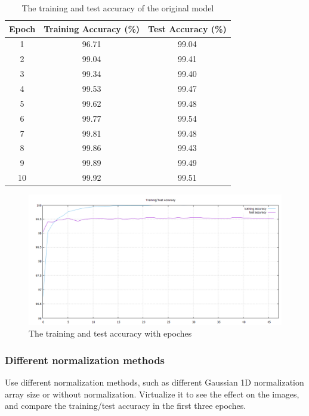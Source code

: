 \documentclass[final]{siamltexmm}
\begin{document}
{\begin{table}[H]
\begin{center}
    \begin{tabular}{| c | c | c |}
    \hline
    Epoch & Training Accuracy (\%) & Test Accuracy (\%) \\ \hline
    1 & 96.71 & 99.04 \\ \hline
    2 & 99.04 & 99.41 \\ \hline
    3 & 99.34 & 99.40 \\ \hline
    4 & 99.53 & 99.47 \\ \hline
    5 & 99.62 & 99.48 \\ \hline
    6 & 99.77 & 99.54 \\ \hline
    7 & 99.81 & 99.48 \\ \hline
    8 & 99.86 & 99.43 \\ \hline  
    9 & 99.89 & 99.49 \\ \hline
    10 & 99.92 & 99.51 \\ \hline      
    \end{tabular}
\end{center}
\caption{The training and test accuracy of the original model}
\end{table}

\begin{figure}[H]
  \centering
    \includegraphics[width=1\textwidth]{../fig/accuracy_org.png}
  \caption{The training and test accuracy with epoches}
\end{figure}


\subsubsection{Different normalization methods}
Use different normalization methods, such as different Gaussian 1D normalization array size or without normalization. Virtualize it to see the effect on the images, and compare the training/test accuracy in the first three epoches.

}
\end{document}
